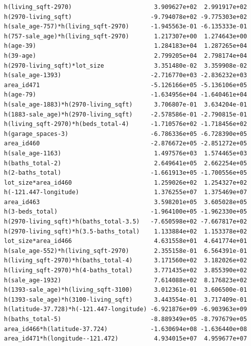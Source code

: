 \documentclass[
]{article}
\begin{document}
\begin{verbatim}
h(living_sqft-2970)                       3.909627e+02  2.991917e+02
h(2970-living_sqft)                      -9.794078e+02 -9.775303e+02
h(sale_age-757)*h(living_sqft-2970)      -1.945563e-01 -6.135333e-01
h(757-sale_age)*h(living_sqft-2970)       1.217307e+00  1.274643e+00
h(age-39)                                 1.284183e+04  1.287265e+04
h(39-age)                                 2.799205e+04  2.798174e+04
h(2970-living_sqft)*lot_size              3.351480e-02  3.359908e-02
h(sale_age-1393)                         -2.716770e+03 -2.836232e+03
area_id471                               -5.126166e+05 -5.136106e+05
h(age-79)                                -1.634956e+04 -1.640461e+04
h(sale_age-1883)*h(2970-living_sqft)      3.706807e-01  3.634204e-01
h(1883-sale_age)*h(2970-living_sqft)     -2.578586e-01 -2.790815e-01
h(living_sqft-2970)*h(beds_total-4)      -1.710576e+02 -1.718456e+02
h(garage_spaces-3)                       -6.786336e+05 -6.728390e+05
area_id460                               -2.876672e+05 -2.851272e+05
h(sale_age-1163)                          1.497576e+03  1.574465e+03
h(baths_total-2)                          2.649641e+05  2.662254e+05
h(2-baths_total)                         -1.661913e+05 -1.700556e+05
lot_size*area_id460                       1.259026e+02  1.254327e+02
h(-121.447-longitude)                     1.376255e+07  1.375469e+07
area_id463                                3.598201e+05  3.605028e+05
h(3-beds_total)                          -1.964100e+05 -1.962330e+05
h(2970-living_sqft)*h(baths_total-3.5)   -7.650598e+02 -7.667817e+02
h(2970-living_sqft)*h(3.5-baths_total)    1.133884e+02  1.153378e+02
lot_size*area_id466                       4.631558e+01  4.641774e+01
h(sale_age-552)*h(living_sqft-2970)       2.355158e-01  6.564391e-01
h(living_sqft-2970)*h(baths_total-4)      3.171560e+02  3.182026e+02
h(living_sqft-2970)*h(4-baths_total)      3.771435e+02  3.855390e+02
h(sale_age-1932)                          7.614088e+02  8.176823e+02
h(1393-sale_age)*h(living_sqft-3100)      3.012361e-01  3.606500e-01
h(1393-sale_age)*h(3100-living_sqft)      3.443554e-01  3.717409e-01
h(latitude-37.728)*h(-121.447-longitude) -6.921876e+09 -6.903963e+09
h(baths_total-5)                         -8.889349e+05 -8.797679e+05
area_id466*h(latitude-37.724)            -1.630694e+08 -1.636440e+08
area_id471*h(longitude--121.472)          4.934015e+07  4.959677e+07
                                                                    

\end{verbatim}
\end{document}
